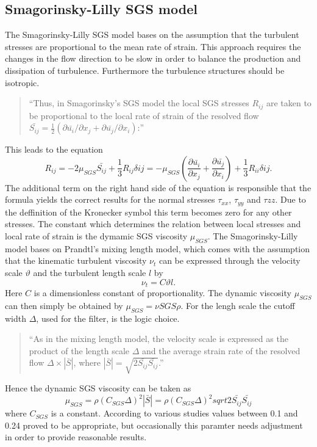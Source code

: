 \subsection{Smagorinsky-Lilly SGS model}
The Smagorinsky-Lilly SGS model bases on the assumption that the turbulent stresses are proportional to the mean rate of strain. This approach requires the changes in the flow direction to be slow in order to balance the production and dissipation of turbulence. Furthermore the turbulence structures should be isotropic.
\begin{quote}
``Thus, in Smagorinsky's SGS model the local SGS stresses $R_{ij}$ are taken to be proportional to the local rate of strain of the resolved flow $\bar{S_{ij}} = \frac{1}{2}(\partial \bar{u_i}/\partial x_j + \partial \bar{u_j}/\partial x_i)$:''
\end{quote}
This leads to the equation
\begin{equation}
R_{ij} = -2 \mu_{SGS} \bar{S_{ij}} + \frac{1}{3} R_{ij} \delta{ij} = -\mu_{SGS} \left( \frac{\partial \bar{u_i}}{\partial x_j} + \frac{\partial \bar{u_j}}{\partial x_i} \right) + \frac{1}{3} R_{ii} \delta{ij}.
\end{equation}
The additional term on the right hand side of the equation is responsible that the formula yields the correct results for the normal stresses $\tau_{xx}$, $\tau_{yy}$ and $\tau{zz}$. Due to the deffinition of the Kronecker symbol this term becomes zero for any other stresses. The constant which determines the relation between local stresses and local rate of strain is the dymamic SGS viscosity $\mu_{SGS}$.
The Smagorinsky-Lilly model bases on Prandtl's mixing length model, which comes with the assumption that the kinematic turbulent viscosity $\nu_t$ can be expressed through the velocity scale $\vartheta$ and the turbulent length scale $l$ by
\begin{equation}
\nu_t = C \vartheta l .
\end{equation}
Here $C$ is a dimensionless constant of proportionality. The dynamic viscosity $\mu_{SGS}$ can then simply be obtained by $\mu_{SGS} = \nu{SGS} \rho$. For the lengh scale the cutoff width $\Delta$, used for the filter, is the logic choice.
\begin{quote}
``As in the mixing length model, the velocity scale is expressed as the product of the length scale $\Delta$ and the average strain rate of the resolved flow $\Delta \times |\bar{S}|$, where $|\bar{S}| = \sqrt{2 \bar{S_{ij}} \bar{S_{ij}}}$.''
\end{quote}
Hence the dynamic SGS viscosity can be taken as
\begin{equation}
\mu_{SGS} = \rho (C_{SGS} \Delta)^2 |\bar{S}| = \rho(C_{SGS} \Delta)^2 sqrt{2 \bar{S_{ij}} \bar{S_{ij}}}
\end{equation}
where $C_{SGS}$ is a constant. According to various studies values between 0.1 and 0.24 proved to be appropriate, but occasionally this paramter needs adjustment in order to provide reasonable results.
